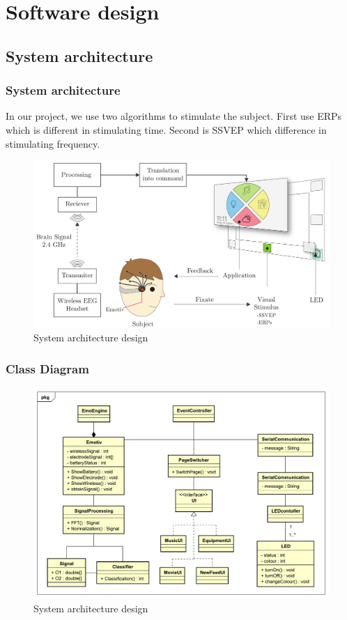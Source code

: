 \chapter{Software design}

\label{ch:Software design}

\setlength{\parindent}{4em}
\setlength{\parskip}{1em}
\renewcommand{\baselinestretch}{1.5}

\section{System architecture}

\subsection{System architecture}
\hspace{1.5cm}In our project, we use two algorithms to stimulate the subject. First use ERPs which is different in stimulating time. Second is SSVEP which difference in stimulating frequency.

\begin{figure}[h]
	\centering
	\includegraphics[scale = 0.3]{chapter5/architec.pdf}
	\caption{System architecture design}
\end{figure}

\subsection{Class Diagram}

\begin{figure}[h]
	\centering
	\includegraphics[scale = 0.5]{chapter5/Class.pdf}
	\caption{System architecture design}
\end{figure}